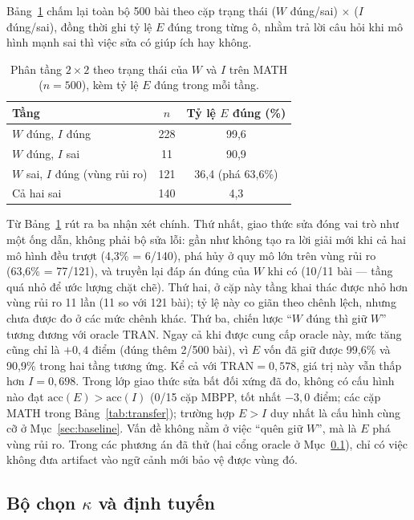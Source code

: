 \documentclass[12pt,a4paper]{article}
\newcommand{\CEIL}{\mathrm{TRAN}}
\newcommand{\acc}{\mathrm{acc}}
\begin{document}
Bảng~\ref{tab:222} chấm lại toàn bộ 500 bài theo cặp trạng thái (\(W\) đúng/sai) \(\times\) (\(I\) đúng/sai), đồng thời ghi tỷ lệ \(E\) đúng trong từng ô, nhằm trả lời câu hỏi khi mô hình mạnh sai thì việc sửa có giúp ích hay không.

\begin{table}[htbp]
\centering
\small
\begin{tabular}{@{}l c c@{}}
\toprule
Tầng & \(n\) & Tỷ lệ \(E\) đúng (\%) \\
\midrule
\(W\) đúng, \(I\) đúng & 228 & 99,6\\
\(W\) đúng, \(I\) sai & 11 & 90,9\\
\(W\) sai, \(I\) đúng (vùng rủi ro) & 121 & 36,4 \quad (phá 63,6\%)\\
Cả hai sai & 140 & 4,3\\
\bottomrule
\end{tabular}
\caption{Phân tầng \(2\times 2\) theo trạng thái của \(W\) và \(I\) trên MATH (\(n=500\)), kèm tỷ lệ \(E\) đúng trong mỗi tầng.}
\label{tab:222}
\end{table}

Từ Bảng~\ref{tab:222} rút ra ba nhận xét chính. Thứ nhất, giao thức sửa đóng vai trò như một ống dẫn, không phải bộ sửa lỗi: gần như không tạo ra lời giải mới khi cả hai mô hình đều trượt (4,3\% = 6/140), phá hủy ở quy mô lớn trên vùng rủi ro (63,6\% = 77/121), và truyền lại đáp án đúng của \(W\) khi có (10/11 bài --- tầng quá nhỏ để ước lượng chặt chẽ). Thứ hai, ở cặp này tầng khai thác được nhỏ hơn vùng rủi ro 11 lần (11 so với 121 bài); tỷ lệ này co giãn theo chênh lệch, nhưng chưa được đo ở các mức chênh khác. Thứ ba, chiến lược “\(W\) đúng thì giữ \(W\)” tương đương với oracle \(\CEIL\). Ngay cả khi được cung cấp oracle này, mức tăng cũng chỉ là \(+0{,}4\) điểm (đúng thêm 2/500 bài), vì \(E\) vốn đã giữ được 99,6\% và 90,9\% trong hai tầng tương ứng. Kể cả với \(\CEIL = 0{,}578\), giá trị này vẫn thấp hơn \(I = 0{,}698\). Trong lớp giao thức sửa bất đối xứng đã đo, không có cấu hình nào đạt \(\acc(E) > \acc(I)\) (0/15 cặp MBPP, tốt nhất \(-3{,}0\) điểm; các cặp MATH trong Bảng~\ref{tab:transfer}); trường hợp \(E>I\) duy nhất là cấu hình cùng cỡ ở Mục~\ref{sec:baseline}. Vấn đề không nằm ở việc “quên giữ \(W\)”, mà là \(E\) phá vùng rủi ro. Trong các phương án đã thử (hai cổng oracle ở Mục~\ref{sec:kappa}), chỉ có việc không đưa artifact vào ngữ cảnh mới bảo vệ được vùng đó.

\subsection{Bộ chọn \(\kappa\) và định tuyến}\label{sec:kappa}
\end{document}
